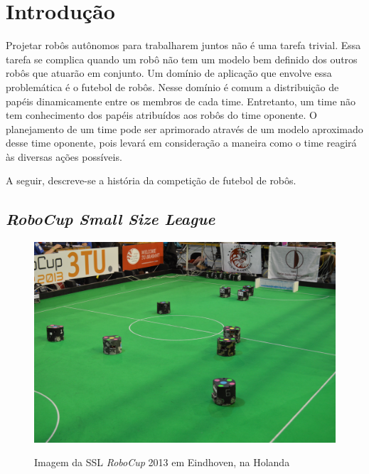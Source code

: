 \chapter{Introdução}


Projetar robôs autônomos para trabalharem juntos não é uma tarefa trivial. Essa tarefa se
complica quando um robô não tem um modelo bem definido dos outros robôs que atuarão em
conjunto. Um domínio de aplicação que envolve essa problemática é o futebol de robôs.
Nesse domínio é comum a distribuição de papéis dinamicamente entre os membros de cada
time. Entretanto, um time não tem conhecimento dos papéis atribuídos aos robôs
do time oponente. O planejamento de um time pode ser aprimorado através de um modelo
aproximado desse time oponente, pois levará em consideração a maneira como o
time reagirá às diversas ações possíveis.

A seguir, descreve-se a história da competição de futebol de robôs.

\section{\textit{RoboCup Small Size League}}

\begin{figure}
  \includegraphics[width = \linewidth]{figuras/robocup2013}\label{robocup2013}
  \caption{Imagem da SSL \textit{RoboCup} 2013 em Eindhoven, na Holanda}
\end{figure}

